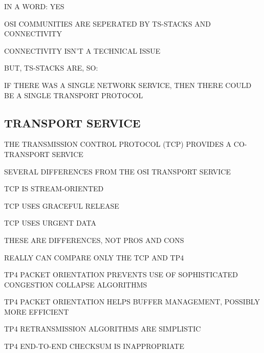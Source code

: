 \begin{bwslide}

\begin{nrtc}
\item	IN A WORD: YES

\item	OSI COMMUNITIES ARE SEPERATED BY TS-STACKS AND CONNECTIVITY

\item	CONNECTIVITY ISN'T A TECHNICAL ISSUE

\item	BUT, TS-STACKS ARE, SO:
    \begin{nrtc}
    \item	IF THERE WAS A SINGLE NETWORK SERVICE,
		THEN THERE COULD BE A SINGLE TRANSPORT PROTOCOL
    \end{nrtc}
\end{nrtc}
\end{bwslide}


\begin{bwslide}
\part*	{TRANSPORT SERVICE}\bf

\begin{nrtc}
\item	THE TRANSMISSION CONTROL PROTOCOL (TCP) PROVIDES A CO-TRANSPORT
	SERVICE

\item	SEVERAL DIFFERENCES FROM THE OSI TRANSPORT SERVICE
    \begin{nrtc}
    \item	TCP IS STREAM-ORIENTED

    \item	TCP USES GRACEFUL RELEASE

    \item	TCP USES URGENT DATA
    \end{nrtc}

\item	THESE ARE DIFFERENCES, NOT PROS AND CONS
\end{nrtc}
\end{bwslide}


\begin{bwslide}

\begin{nrtc}
\item	REALLY CAN COMPARE ONLY THE TCP AND TP4

\item	TP4 PACKET ORIENTATION PREVENTS USE OF SOPHISTICATED CONGESTION
	COLLAPSE ALGORITHMS

\item	TP4 PACKET ORIENTATION HELPS BUFFER MANAGEMENT,
	POSSIBLY MORE EFFICIENT

\item	TP4 RETRANSMISSION ALGORITHMS ARE SIMPLISTIC

\item	TP4 END-TO-END CHECKSUM IS INAPPROPRIATE
\end{nrtc}
\end{bwslide}


